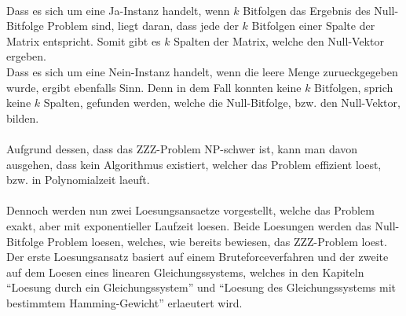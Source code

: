 \documentclass[a4paper,10pt,ngerman]{scrartcl}
\begin{document}
\\Dass es sich um eine Ja-Instanz handelt, wenn $k$ Bitfolgen das Ergebnis des Null-Bitfolge Problem sind, liegt daran, dass jede der $k$ Bitfolgen einer Spalte der Matrix entspricht. Somit gibt es $k$ Spalten der Matrix, welche den Null-Vektor ergeben.
\\Dass es sich um eine Nein-Instanz handelt, wenn die leere Menge zurueckgegeben wurde, ergibt ebenfalls Sinn. Denn in dem Fall konnten keine $k$ Bitfolgen, sprich keine $k$ Spalten, gefunden werden, welche die Null-Bitfolge, bzw. den Null-Vektor, bilden.
\\
\\
Aufgrund dessen, dass das ZZZ-Problem NP-schwer ist, kann man davon ausgehen, dass kein Algorithmus existiert, welcher das Problem effizient loest, bzw. in Polynomialzeit laeuft.\\
\\
Dennoch werden nun zwei Loesungsansaetze vorgestellt, welche das Problem exakt, aber mit exponentieller Laufzeit loesen. Beide Loesungen werden das Null-Bitfolge Problem loesen, welches, wie bereits bewiesen, das ZZZ-Problem loest. Der erste Loesungsansatz basiert auf einem Bruteforceverfahren und der zweite auf dem Loesen eines linearen Gleichungssystems, welches in den Kapiteln "`Loesung durch ein Gleichungssystem"' und "`Loesung des Gleichungssystems mit bestimmtem Hamming-Gewicht"' erlaeutert wird.
\end{document}
